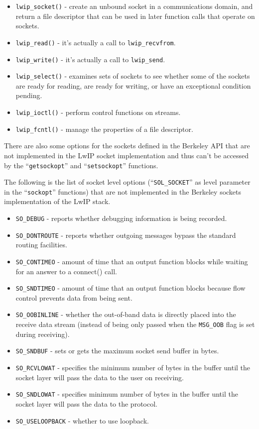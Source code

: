 \begin{itemize}
  \item \verb/lwip_socket()/ - create an unbound socket in a communications domain, and return a file descriptor that can be used in later function calls that operate on sockets.
  \item \verb/lwip_read()/ - it's actually a call to \verb/lwip_recvfrom/.
  \item \verb/lwip_write()/ - it's actually a call to \verb/lwip_send/.
  \item \verb/lwip_select()/ - examines sets of sockets to  see  whether some of the sockets are ready for reading, are ready for writing, or have an exceptional condition pending.
  \item \verb/lwip_ioctl()/ - perform control functions on streams.
  \item \verb/lwip_fcntl()/ - manage the properties of a file descriptor.
\end{itemize}

There are also some options for the sockets defined in the Berkeley API that are not implemented in the LwIP socket implementation and thus can't be accessed by the ``\verb/getsockopt/'' and ``\verb/setsockopt/'' functions.

The following is the list of socket level options (``\verb/SOL_SOCKET/'' as level parameter in the ``\verb/sockopt/'' functions) that are not implemented in the Berkeley sockets implementation of the LwIP stack.

\begin{itemize}
  \item \verb/SO_DEBUG/ - reports whether debugging information is being recorded.
  \item \verb/SO_DONTROUTE/ - reports whether outgoing messages bypass the standard routing facilities.
  \item \verb/SO_CONTIMEO/ - amount of time that an output function blocks while waiting for an answer to a connect() call.
  \item \verb/SO_SNDTIMEO/ - amount of time that an output function blocks because flow control prevents data from being sent.
  \item \verb/SO_OOBINLINE/ - whether the out-of-band data is directly placed into the receive data stream (instead of being only passed when the \verb/MSG_OOB/ flag is set during receiving).
  \item \verb/SO_SNDBUF/ - sets or gets the maximum socket send buffer in bytes.
  \item \verb/SO_RCVLOWAT/ - specifies the minimum number of bytes in the buffer until the socket layer will pass the data to the user on receiving.
  \item \verb/SO_SNDLOWAT/ - specifies minimum number of bytes in the buffer until the socket layer will pass the data to the protocol.
  \item \verb/SO_USELOOPBACK/ - whether to use loopback.
\end{itemize}

